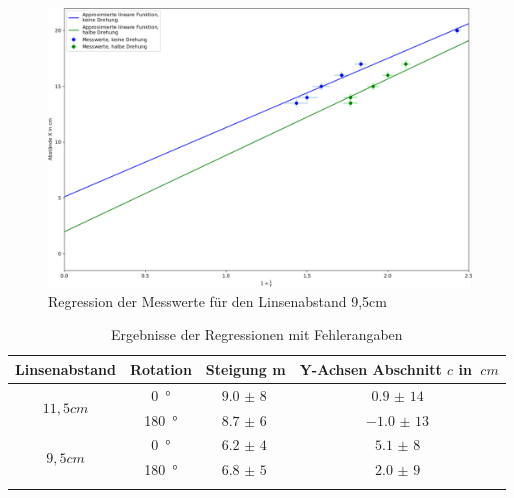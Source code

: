 \begin{figure}[h!]{}
    \begin{center}
        \includegraphics[scale=0.4]{./fig/Abbe_Reg_Messreihe2_Plot.pdf}
        \caption{Regression der Messwerte für den Linsenabstand 9,5cm}
        \label{fig:Abbe-Regress-S2}
    \end{center}
\end{figure}


\clearpage

\begin{table}[h!]
    \begin{center}
        \caption{Ergebnisse der Regressionen mit Fehlerangaben}
        \begin{tabular}{cccc}
            \hline
            Linsenabstand   & Rotation   & Steigung m   & Y-Achsen Abschnitt $c$ in $\SI{}{cm}$\\
            \hline
            
            \multirow{2}{*}{$11,5cm$} & \SI{0}{\degree}   & $\SI{9,0(8)}{}$   & $\SI{0,9(14)}{}$ \\
                                    & \SI{180}{\degree} & $\SI{8,7(6)}{}$   & $\SI{-1,0(13)}{}$ \\
            \hline
            \multirow{2}{*}{$9,5cm$}  & \SI{0}{\degree}   & $\SI{6,2(4)}{}$ & $\SI{5,1(8)}{}$ \\
                                    & \SI{180}{\degree} & $\SI{6,8(5)}{}$  & $\SI{2,0(9)}{}$ \\
            \hline
            \label{tab:abbe-Regression-S1}
        \end{tabular}
    \end{center}
\end{table}

